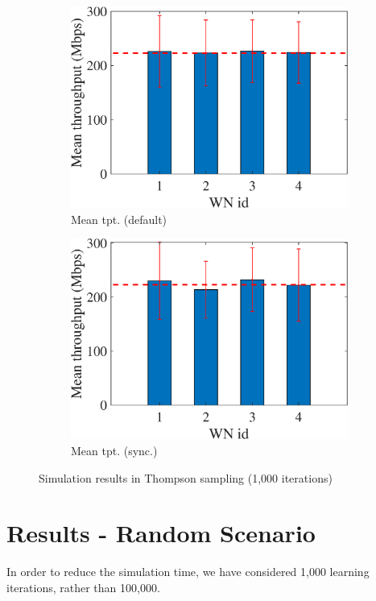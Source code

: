 \documentclass[preprint,12pt]{article}
\begin{document}
\begin{figure}[h!]
\begin{subfigure}[b]{.33\textwidth}
		\includegraphics[width=\textwidth]{images/mean_tpt_TS}
		\caption{Mean tpt. (default)}\label{fig:mean_tpt_TS}
	\end{subfigure}
	\begin{subfigure}[b]{.33\textwidth}
		\includegraphics[width=\textwidth]{images/mean_tpt_OTS}
		\caption{Mean tpt. (sync.)}\label{fig:mean_tpt_OTS}
	\end{subfigure}
	\caption{Simulation results in Thompson sampling (1,000 iterations)}
	\label{fig:ts}
\end{figure}

\section{Results - Random Scenario}
In order to reduce the simulation time, we have considered 1,000 learning iterations, rather than 100,000.
\end{document}

